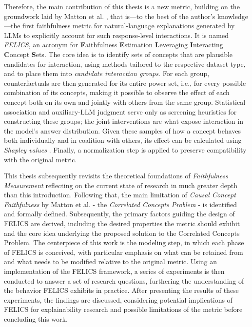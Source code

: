 Therefore, the main contribution of this thesis is a new metric, building on the groundwork laid by Matton et al. \cite{mattonWalkTalkMeasuring2024}, that is---to the best of the author's knowledge---the first faithfulness metric for natural-language explanations generated by LLMs to explicitly account for such response-level interactions. It is named \emph{FELICS}, an acronym for \textbf{F}aithfulness \textbf{E}stimation \textbf{L}everaging \textbf{I}nteracting \textbf{C}oncept \textbf{S}ets. The core idea is to identify sets of concepts that are plausible candidates for interaction, using methods tailored to the respective dataset type, and to place them into \emph{candidate interaction groups}. For each group, counterfactuals are then generated for its entire power set, i.e., for every possible combination of its concepts, making it possible to observe the effect of each concept both on its own and jointly with others from the same group. Statistical association and auxiliary-LLM judgment serve only as screening heuristics for constructing these groups; the joint interventions are what expose interaction in the model's answer distribution. Given these samples of how a concept behaves both individually and in coalition with others, its effect can be calculated using \emph{Shapley values} \cite{shapley17ValueNPerson1953}. Finally, a normalization step is applied to preserve compatibility with the original metric.

This thesis subsequently revisits the theoretical foundations of \emph{Faithfulness Measurement} reflecting on the current state of research in much greater depth than this introduction. Following that, the main limitation of \emph{Causal Concept Faithfulness} by Matton et al. \cite{mattonWalkTalkMeasuring2024} - the \emph{Correlated Concepts Problem} - is identified and formally defined. Subsequently, the primary factors guiding the design of FELICS are derived, including the desired properties the metric should exhibit and the core idea underlying the proposed solution to the Correlated Concepts Problem. The centerpiece of this work is the modeling step, in which each phase of FELICS is conceived, with particular emphasis on what can be retained from and what needs to be modified relative to the original metric. Using an implementation of the FELICS framework, a series of experiments is then conducted to answer a set of research questions, furthering the understanding of the behavior FELICS exhibits in practice. After presenting the results of these experiments, the findings are discussed, considering potential implications of FELICS for explainability research and possible limitations of the metric before concluding this work.

